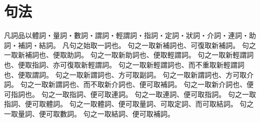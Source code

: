 \chapter{句法}
凡詞品以體詞・量詞・數詞・謂詞・輕謂詞・指詞・定詞・狀詞・介詞・連詞・助詞・補詞・結詞。
凡句之始取一詞也。
句之一取新補詞也、可復取新補詞。
句之一取新補詞也、便取助詞。
句之一取新助詞也、便取輕謂詞。
句之一取新輕謂詞也、便取指詞、亦可復取新輕謂詞。
句之一取新輕謂詞也、而不重取新輕謂詞也、便取謂詞。
句之一取新謂詞也、方可取副詞。
句之一取新謂詞也、方可取介詞。
句之一取新謂詞也、而不取新介詞也、便可取補詞。
句之一取新介詞也、便可指詞也。
句之一取指詞、便可取連詞。
句之一取連詞、便可取指詞。
句之一取指詞、便可取體詞。
句之一取體詞、便可取量詞、可取定詞、而可取結詞。
句之一取量詞、便可取數詞。
句之一取結詞、便可取補詞。
